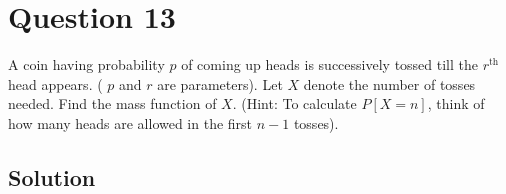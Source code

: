 \section*{Question 13}

A coin having probability \( p \) of coming up heads is successively tossed till the \( r^{\text {th }} \) head appears.
( \( p \) and \( r \) are parameters).
Let \( X \) denote the number of tosses needed. Find the mass function of \( X \).
(Hint: To calculate \( P[X=n] \), think of how many heads are allowed in the first \( n-1 \) tosses).

\subsection*{Solution}
